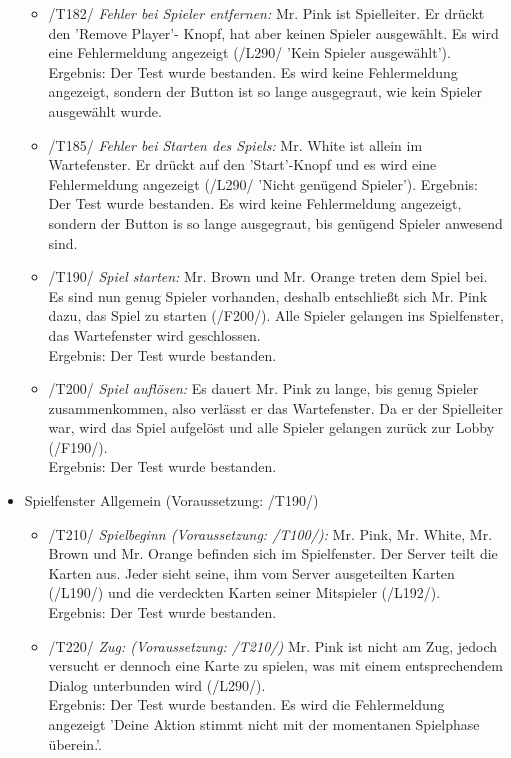 \documentclass[a4paper]{article}
\begin{document}
\begin{itemize}
\begin{itemize}
		\item /T182/ \textit{Fehler bei Spieler entfernen:} Mr. Pink ist Spielleiter. Er drückt den 'Remove Player'-				Knopf, hat aber keinen Spieler ausgewählt. Es wird eine Fehlermeldung angezeigt (/L290/ 'Kein Spieler ausgewählt'). 		\\
		Ergebnis: Der Test wurde bestanden. Es wird keine Fehlermeldung angezeigt, sondern der Button ist so lange 				ausgegraut, wie kein Spieler ausgewählt wurde. 
		
		\item /T185/ \textit{Fehler bei Starten des Spiels:} Mr. White ist allein im Wartefenster. Er drückt auf den 				'Start'-Knopf und es wird eine Fehlermeldung angezeigt (/L290/ 'Nicht genügend Spieler').
		Ergebnis: Der Test wurde bestanden. Es wird keine Fehlermeldung angezeigt, sondern der Button is so lange 				ausgegraut, bis genügend Spieler anwesend sind.
		
		\item /T190/ \textit{Spiel starten:} Mr. Brown und Mr. Orange treten dem Spiel bei. Es sind nun genug Spieler 				vorhanden, deshalb entschließt sich Mr. Pink dazu, das Spiel zu starten (/F200/). Alle Spieler gelangen ins 					Spielfenster, das Wartefenster wird geschlossen. \\
		Ergebnis: Der Test wurde bestanden.
		
		\item /T200/ \textit{Spiel auflösen:} Es dauert Mr. Pink zu lange, bis genug Spieler zusammenkommen, also verlässt 			er das Wartefenster. Da er der Spielleiter war, wird das Spiel aufgelöst und alle Spieler gelangen zurück 			zur Lobby (/F190/). \\
		Ergebnis: Der Test wurde bestanden.
	\newpage	
	\end{itemize}
	\item Spielfenster Allgemein (Voraussetzung: /T190/)
	\begin{itemize}
	
		\item /T210/ \textit{Spielbeginn (Voraussetzung: /T100/):} Mr. Pink, Mr. White, Mr. Brown und Mr. Orange befinden 			sich im Spielfenster. Der Server teilt die Karten aus. Jeder sieht seine, ihm vom Server ausgeteilten 				Karten (/L190/) und die verdeckten Karten seiner Mitspieler (/L192/).   \\
		Ergebnis: Der Test wurde bestanden.
		
		\item /T220/ \textit{Zug: (Voraussetzung: /T210/)} Mr. Pink ist nicht am Zug, jedoch versucht er dennoch eine Karte 			zu spielen, was mit einem entsprechendem Dialog  unterbunden wird (/L290/). \\
		Ergebnis: Der Test wurde bestanden. Es wird die Fehlermeldung angezeigt 'Deine Aktion stimmt nicht mit der 				momentanen Spielphase überein.'.
		

\end{itemize}
\end{itemize}
\end{document}
